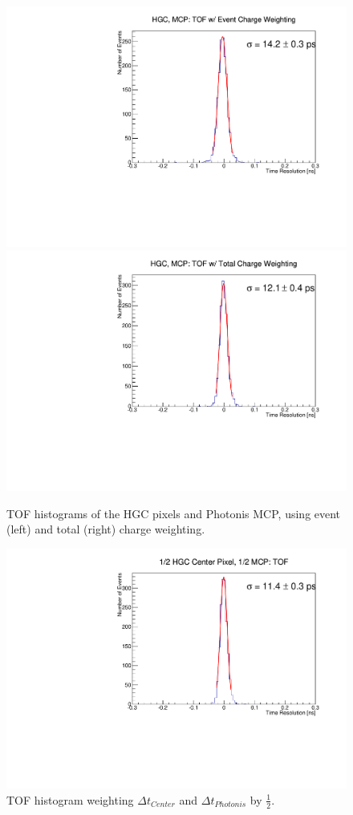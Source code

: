 \documentclass[12pt]{article}
\begin{document}
\begin{figure}[h]
\centering
\begin{minipage}[t]{.64\textwidth}
	\includegraphics[width=.49\textwidth]{deltaT_PicoSil_MCP_EventCharge104.pdf}
	\includegraphics[width=.5\textwidth]{deltaT_PicoSil_MCP_TotalCharge104.pdf}
	\caption{TOF histograms of the HGC pixels and Photonis MCP, using event (left) and total (right) charge weighting. }
	\label{fig:HGC_MCP_event_total_104}
\end{minipage} \hfill
\begin{minipage}[t]{.32\textwidth}
	\includegraphics[width=\textwidth]{deltaT_Center_MCP_Equal104.pdf}
	\caption{TOF histogram weighting $\Delta t_{Center}$ and $\Delta t_{Photonis}$ by $\frac{1}{2}$.}
	\label{fig:CenterMCPEqual104}
\end{minipage}
\end{figure}
\end{document}
